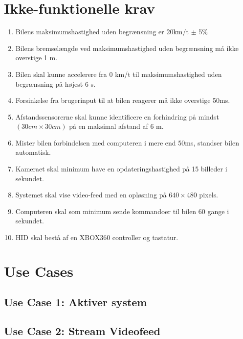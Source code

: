 \section{Ikke-funktionelle krav}
\begin{enumerate}
	\item Bilens maksimumshastighed uden begrænsning er 20km/t $\pm$ 5\% %
	\item Bilens bremselængde ved maksimumshastighed uden begrænsning må ikke overstige 1 m. %
	\item Bilen skal kunne accelerere fra 0 km/t til maksimumshastighed uden begrænsning på højest 6 s. %
	\item Forsinkelse fra brugerinput til at bilen reagerer må ikke overstige 50ms. %
	\item Afstandssensorerne skal kunne identificere en forhindring på mindst $(30cm \times 30cm)$ på en maksimal afstand af 6 m. %
	\item Mister bilen forbindelsen med computeren i mere end 50ms, standser bilen automatisk. 
	\item Kameraet skal minimum have en opdateringshastighed på 15 billeder i sekundet. %
	\item Systemet skal vise video-feed med en opløsning på $640 \times 480$ pixels.
	\item Computeren skal som minimum sende kommandoer til bilen 60 gange i sekundet. 
	\item HID skal bestå af en XBOX360 controller og tastatur.
\end{enumerate}

\newpage
\section{Use Cases}

\newpage
\subsection{Use Case 1:  Aktiver system}


\newpage
\subsection{Use Case 2: Stream Videofeed}


